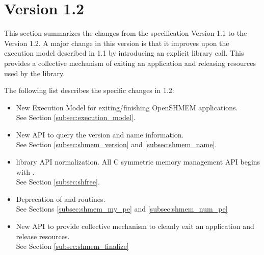 \section{Version 1.2}
This section summarizes the changes from the \openshmem specification Version 1.1 to the Version 1.2.  
A major change in this version is that it improves upon the execution model described in 1.1 by introducing an explicit  library call. This provides a collective mechanism of exiting an \openshmem application and releasing resources used by the library.  



The following list describes the specific changes in 1.2:
\begin{itemize}
\item New Execution Model for exiting/finishing OpenSHMEM applications.
\\See Section  \ref{subsec:execution_model}.
\item New API to query the version and name information. 
\\See Section \ref{subsec:shmem_version} and \ref{subsec:shmem_name}.
\item \openshmem library API normalization. All C symmetric memory management API begins with  .
\\See Section \ref{subsec:shfree}.
\item Deprecation of  and  routines.
\\See Sections \ref{subsec:shmem_my_pe} and \ref{subsec:shmem_num_pe}
\item New API  to provide collective mechanism to cleanly exit an \openshmem application and release resources.
\\See Section \ref{subsec:shmem_finalize}

\end{itemize}
